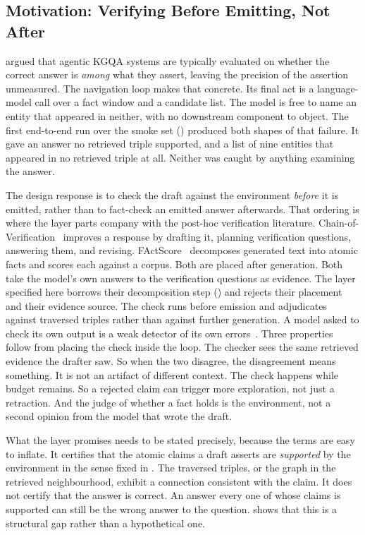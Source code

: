 \subsection{Motivation: Verifying Before Emitting, Not
After}\label{sec:verify-motivation}

 argued that agentic KGQA systems are typically evaluated
on whether the correct answer is \emph{among} what they assert, leaving
the precision of the assertion unmeasured. The
navigation loop makes that concrete. Its final act is a language-model call over
a fact window and a candidate list. The model is free to name an entity that
appeared in neither, with no downstream component to object. The first
end-to-end run over the smoke set () produced both
shapes of that failure. It gave an answer no retrieved triple supported, and a
list of nine entities that appeared in no retrieved triple at all. Neither was
caught by anything examining the answer.

The design response is to check the draft against the environment \emph{before}
it is emitted, rather than to fact-check an emitted answer afterwards. That
ordering is where the layer parts company with the post-hoc verification
literature. Chain-of-Verification~\cite{dhuliawala2024chain} improves a response
by drafting it, planning verification questions, answering them, and revising.
FActScore~\cite{min2023factscore} decomposes generated text into atomic facts
and scores each against a corpus. Both are placed after generation. Both take
the model's own answers to the verification questions as evidence. The layer
specified here borrows their decomposition step ()
and rejects their placement and their evidence source. The check runs before
emission and adjudicates against traversed triples rather than against further
generation. A model asked to check its own output is a weak detector of its own
errors~\cite{huang2024selfcorrect}. Three properties follow from placing the
check inside the loop. The checker sees the same retrieved evidence the drafter
saw. So when the two disagree, the disagreement means something. It is not an
artifact of different context. The check happens while budget remains. So a
rejected claim can trigger more exploration, not just a retraction. And the
judge of whether a fact holds is the environment, not a second opinion from the
model that wrote the draft.

What the layer promises needs to be stated precisely, because the terms are easy
to inflate. It certifies that the atomic claims a draft asserts are
\emph{supported} by the environment in the sense fixed in
. The traversed triples, or the graph in the
retrieved neighbourhood, exhibit a connection consistent with the claim. It does
not certify that the answer is correct. An answer every one of whose claims is
supported can still be the wrong answer to the question.
 shows that this is a structural gap rather than
a hypothetical one.

